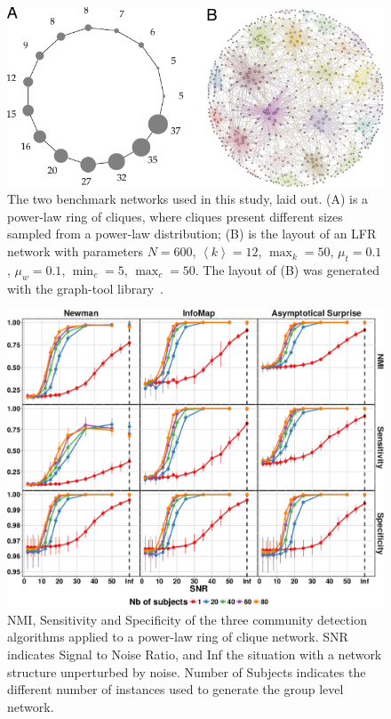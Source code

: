 \begin{figure}[htb!]
\includegraphics[width=1\textwidth]{images/pacopaperfigure1.pdf}
\caption{The two benchmark networks used in this study, laid out. (A) is a power-law ring of cliques, where cliques present different sizes sampled from a power-law distribution;
(B) is the layout of an LFR network with parameters $N=600$, $\left< k \right>=12$,  $\max_k=50$, $\mu_t=0.1$, $\mu_w=0.1$, $\min_c=5$, $\max_c=50$.
The layout of (B) was generated with the graph-tool library~\cite{peixoto_graph_tool_2014}.}
\label{fig:lfrringclique}
\end{figure}

\begin{figure}[htb!]
\includegraphics[width=\textwidth]{images/pacopaperfigure4.pdf}
\caption{NMI, Sensitivity and Specificity of the three community detection algorithms applied to a power-law ring of clique network. SNR indicates Signal to Noise Ratio, and Inf the situation with a network structure unperturbed by noise. Number of Subjects indicates the different number of instances used to generate the group level network.}
\label{fig:nmisensitivityspecificityringclique}
\end{figure}


